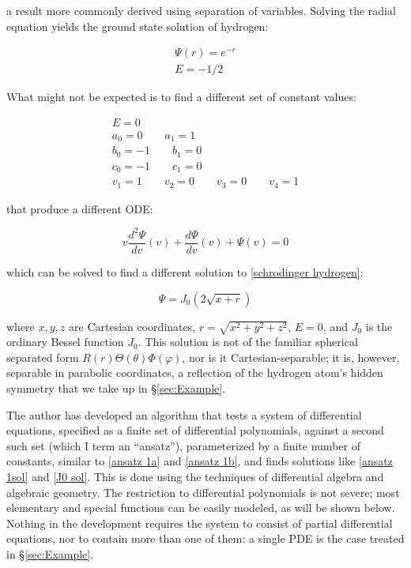 \documentclass{article}
\theoremstyle{definition}
\theoremstyle{plain}
\newif\ifNSexample
\begin{document}
a result more commonly derived using separation of variables.  Solving the radial equation
yields the ground state solution of hydrogen:

\begin{equation}
\begin{gathered}
\Psi(r)=e^{-r} \\
E=-1/2
\end{gathered}
\end{equation}

What might not be expected is to find a different set of constant values:

\begin{equation}
\label{J0 sol}
\begin{gathered}
E = 0 \\
a_0 = 0 \qquad
a_1 = 1 \\
b_0 = -1 \qquad
b_1 = 0 \\
c_0 = -1 \qquad
c_1 = 0 \\
v_1 = 1 \qquad
v_2 = 0 \qquad
v_3 = 0 \qquad
v_4 = 1
\end{gathered}
\end{equation}

that produce a different ODE:

\begin{equation}
v \frac{d^2 \Psi}{dv}(v) + \frac{d\Psi}{dv}(v) + \Psi(v) = 0
\end{equation}

which can be solved to find a different solution to \eqref{schrodinger hydrogen}:

\begin{equation}
\Psi = J_0(2\sqrt{x+r})
\end{equation}

where $x,y,z$ are Cartesian coordinates, $r=\sqrt{x^2+y^2+z^2}$, $E=0$,
and $J_0$ is the ordinary Bessel function $J_0$.  This solution is not of the
familiar spherical separated form $R(r)\Theta(\theta)\Phi(\varphi)$, nor is it
Cartesian-separable; it is, however, separable in parabolic coordinates, a
reflection of the hydrogen atom's hidden symmetry that we take up in
\S\ref{sec:Example}.

The author has developed an algorithm that tests a system of differential
equations, specified as a finite set of differential polynomials,
against a second such set (which I term an ``ansatz''),
parameterized by a finite number of constants,
similar to \eqref{ansatz 1a} and \eqref{ansatz 1b},
and finds solutions like \eqref{ansatz 1sol} and \eqref{J0 sol}.  This is done using the techniques of differential
algebra and algebraic geometry.  The restriction to differential
polynomials is not severe; most elementary and special functions
can be easily modeled, as will be shown below.  Nothing in the development
requires the system to consist of partial differential equations, nor to
contain more than one of them: a single PDE is the case treated in
\S\ref{sec:Example}\ifNSexample, a system of four in \S\ref{sec:NavierStokes}\fi.
\end{document}
